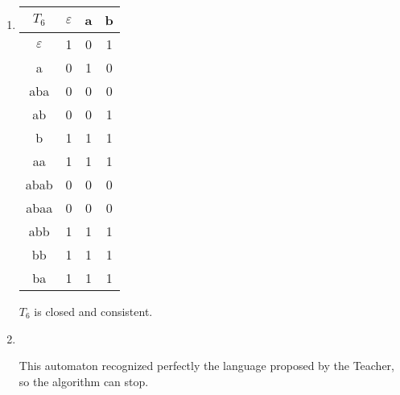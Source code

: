 \begin{enumerate}
  \item \begin{minipage}{0.3\textwidth}
          \begin{tabular}{c||c|c|c}
            $T_6$         & $\varepsilon$ & a & b \\
            \hline\hline
            $\varepsilon$ & 1             & 0 & 1 \\
            a             & 0             & 1 & 0 \\
            aba           & 0             & 0 & 0 \\
            ab            & 0             & 0 & 1 \\
            b             & 1             & 1 & 1 \\
            \hline\hline
            aa            & 1             & 1 & 1 \\
            abab          & 0             & 0 & 0 \\
            abaa          & 0             & 0 & 0 \\
            abb           & 1             & 1 & 1 \\
            bb            & 1             & 1 & 1 \\
            ba            & 1             & 1 & 1 \\
          \end{tabular}
        \end{minipage} \quad
        \begin{minipage}{0.5\textwidth}
          $T_6$ is closed and consistent.
        \end{minipage}

  \item \begin{minipage}{0.3\textwidth}
          
        \end{minipage}\quad\\
        \begin{minipage}{0.6\textwidth}
          This automaton recognized perfectly the language proposed by the Teacher, so the algorithm can stop.
        \end{minipage}
\end{enumerate}